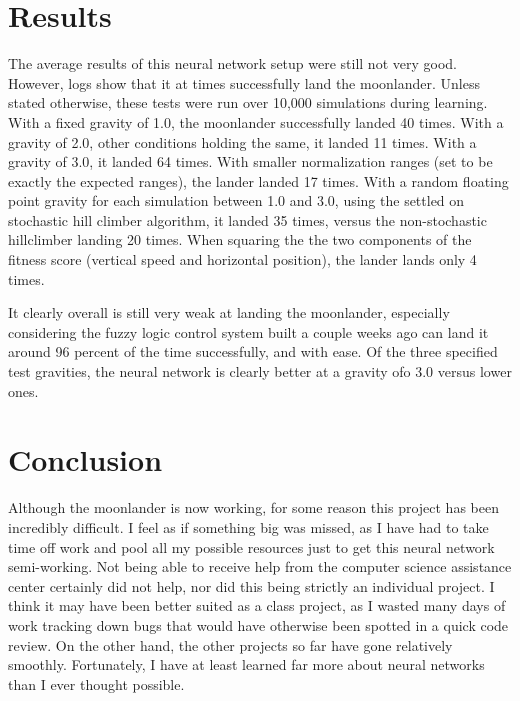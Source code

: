 \documentclass[12pt, article]{scrartcl}
\begin{document}
\section{Results}
The average results of this neural network setup were still not very good. However, logs show that it at times successfully land the moonlander. Unless stated otherwise, these tests were run over 10,000 simulations during learning. With a fixed gravity of 1.0, the moonlander successfully landed 40 times. With a gravity of 2.0, other conditions holding the same, it landed 11 times. With a gravity of 3.0, it landed 64 times. With smaller normalization ranges (set to  be exactly the expected ranges), the lander landed 17 times. With a random floating point gravity for each simulation between 1.0 and 3.0, using the settled on stochastic hill climber algorithm, it landed 35 times, versus the non-stochastic hillclimber landing 20 times. When squaring the the two components of the fitness score (vertical speed and horizontal position), the lander lands only 4 times.

It clearly overall is still very weak at landing the moonlander, especially considering the fuzzy logic control system built a couple weeks ago can land it around 96 percent of the time successfully, and with ease. Of the three specified test gravities, the neural network is clearly better at a gravity ofo 3.0 versus lower ones.

\section{Conclusion}
Although the moonlander is now working, for some reason this project has been incredibly difficult. I feel as if something big was missed, as I have had to take time off work and pool all my possible resources just to get this neural network semi-working. Not being able to receive help from the computer science assistance center certainly did not help, nor did this being strictly an individual project. I think it may have been better suited as a class project, as I wasted many days of work tracking down bugs that would have otherwise been spotted in a quick code review. On the other hand, the other projects so far have gone relatively smoothly. Fortunately, I have at least learned far more about neural networks than I ever thought possible.
\end{document}
